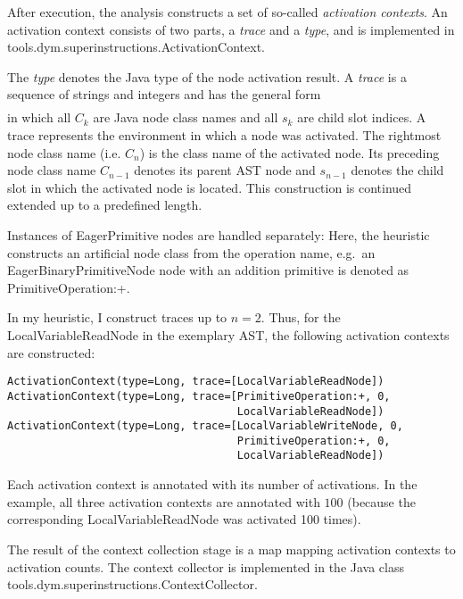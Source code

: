 \documentclass[10pt,a4paper]{article}
\begin{document}
After execution, the analysis constructs a set of so-called \emph{activation contexts}. An activation context consists of two parts, a \emph{trace} and a \emph{type}, and is implemented in \textsf{tools.dym.superinstructions.ActivationContext}.

The \emph{type} denotes the Java type of the node activation result. A \emph{trace} is a sequence of strings and integers and has the general form
\begin{align*}
[ C_0, s_0, C_1, ..., s_{n - 1}, C_{n}]
\end{align*}
in which all $C_k$ are Java node class names and all $s_k$ are child slot indices. A trace represents the environment in which a node was activated. The rightmost node class name (i.e. $C_n$) is the class name of the activated node. Its preceding node class name $C_{n-1}$ denotes its parent AST node and $s_{n-1}$ denotes the child slot in which the activated node is located. This construction is continued extended up to a predefined length.

Instances of \textsf{EagerPrimitive} nodes are handled separately: Here, the heuristic constructs an artificial node class from the operation name, e.g.\ an \textsf{EagerBinaryPrimitiveNode} node with an addition primitive is denoted as \textsf{PrimitiveOperation:+}.

In my heuristic, I construct traces up to $n=2$. Thus, for the \textsf{LocalVariableReadNode} in the exemplary AST, the following activation contexts are constructed:

\begin{verbatim}
ActivationContext(type=Long, trace=[LocalVariableReadNode])
ActivationContext(type=Long, trace=[PrimitiveOperation:+, 0,
                                    LocalVariableReadNode])
ActivationContext(type=Long, trace=[LocalVariableWriteNode, 0,
                                    PrimitiveOperation:+, 0,
                                    LocalVariableReadNode])
\end{verbatim}

Each activation context is annotated with its number of activations. In the example, all three activation contexts are annotated with $100$ (because the corresponding \textsf{LocalVariableReadNode} was activated 100 times). 

The result of the context collection stage is a map mapping activation contexts to activation counts. The context collector is implemented in the Java class \textsf{tools.dym.superinstructions.ContextCollector}.
\end{document}
